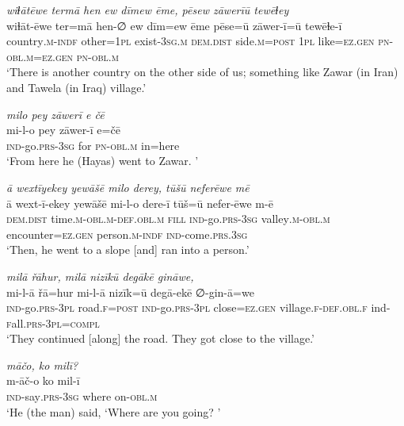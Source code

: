 \ea \label{ŽH.6}
\textit{wiɫātēwe termā hen ew dīmew ēme, pēsew zāwerīū tewēɫey} \\ 
\gll wiɫāt-ēwe ter=mā hen-∅ ew dīm=ew ēme pēse=ū zāwer-ī=ū tewēɫe-ī \\ 
 country\textsc{.m}\textsc{-indf} other\textsc{=1pl} exist\textsc{-3sg}\textsc{.m} \textsc{dem.dist} side\textsc{.m}\textsc{=\textsc{post}} \textsc{1pl} like\textsc{=ez}\textsc{.gen} \textsc{pn}\textsc{-obl}\textsc{.m}\textsc{=ez}\textsc{.gen} \textsc{pn}\textsc{-obl}\textsc{.m} \\ 
\glt `There is another country on the other side of us; something like Zawar (in Iran) and Tawela (in Iraq) village.'
\z 
 
\ea \label{ŽH.7}
\textit{milo pey zāwerī e čē} \\ 
\gll mi-l-o pey zāwer-ī e=čē \\ 
 \textsc{ind-}go\textsc{.prs}\textsc{-3sg} for \textsc{pn}\textsc{-obl}\textsc{.m} in=here \\ 
\glt `From here he (Hayas) went to Zawar. '
\z 
 
\ea \label{ŽH.8}
\textit{ā wextīyekey yewāšē milo derey, tūšū neferēwe mē} \\ 
\gll ā wext-ī-ekey yewāšē mi-l-o dere-ī tūš=ū nefer-ēwe m-ē \\ 
 \textsc{dem.dist} time\textsc{.m}\textsc{-obl}\textsc{.m}\textsc{-def}\textsc{.obl}\textsc{.m} \textsc{fill} \textsc{ind-}go\textsc{.prs}\textsc{-3sg} valley\textsc{.m}\textsc{-obl}\textsc{.m} encounter\textsc{=ez}\textsc{.gen} person\textsc{.m}\textsc{-indf} \textsc{ind-}come\textsc{.prs}\textsc{.3sg} \\ 
\glt `Then, he went to a slope [and] ran into a person.'
\z 
 
\ea \label{ŽH.15}
\textit{milā řāhur, milā nizīkū degākē gināwe,} \\ 
\gll mi-l-ā řā=hur mi-l-ā nizīk=ū degā-ekē ∅-gin-ā=we \\ 
 \textsc{ind-}go\textsc{.prs}\textsc{-3pl} road\textsc{\textsc{.f}}\textsc{=\textsc{post}} \textsc{ind-}go\textsc{.prs}\textsc{-3pl} close\textsc{=ez}\textsc{.gen} village\textsc{\textsc{.f}}\textsc{-def}\textsc{.obl}\textsc{\textsc{.f}} ind\textsc{-f}all\textsc{.prs}\textsc{-3pl}\textsc{=compl} \\ 
\glt `They continued [along] the road. They got close to the village.'
\z 
 
\ea \label{ŽH.16}
\textit{māčo, ko milī?} \\ 
\gll m-āč-o ko mil-ī \\ 
 \textsc{ind-}say\textsc{.prs}\textsc{-3sg} where on\textsc{-obl}\textsc{.m} \\ 
\glt `He (the man) said, ‘Where are you going? '
\z 
 
